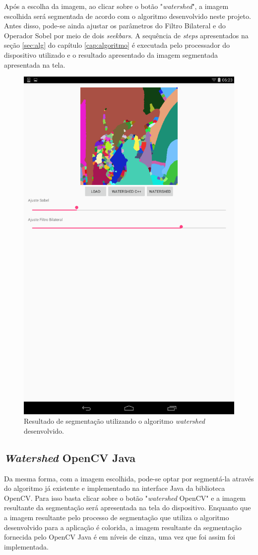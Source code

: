 Após a escolha da imagem, ao clicar sobre o botão "\textit{watershed}", a imagem escolhida será segmentada de acordo com o algoritmo desenvolvido neste projeto. Antes disso, pode-se ainda ajustar os parâmetros do Filtro Bilateral e do Operador Sobel por meio de dois \textit{seekbars}. A sequência de \textit{steps} apresentados na seção \ref{sec:alg} do capítulo \ref{cap:algoritmo} é executada pelo processador do dispositivo utilizado e o resultado apresentado da imagem segmentada apresentada na tela.

  \begin{figure}[!htb]
       \begin{center}  
          \includegraphics[width=0.3\columnwidth]{img/resultado_watershed_desenvolvido_app.png}
           \caption{\label{fig:resultado_watershed_desenvolvido_app}Resultado de segmentação utilizando o algoritmo \textit{watershed} desenvolvido.}
       \end{center}
   \end{figure}  

\subsection{\textit{Watershed} OpenCV Java}

Da mesma forma, com a imagem escolhida, pode-se optar por segmentá-la através do algoritmo já existente e implementado na interface Java da biblioteca OpenCV. Para isso basta clicar sobre o botão "\textit{watershed} OpenCV" e a imagem resultante da segmentação será apresentada na tela do dispositivo. Enquanto que a imagem resultante pelo processo de segmentação que utiliza o algoritmo desenvolvido para a aplicação é colorida, a imagem resultante da segmentação fornecida pelo OpenCV Java é em níveis de cinza, uma vez que foi assim foi implementada.

